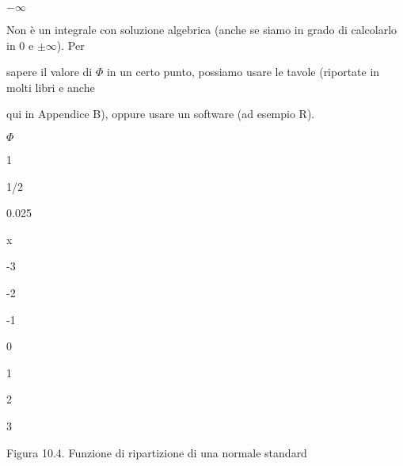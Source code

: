 \documentclass[a4paper,portrait,12pt]{article}
\begin{document}
$-$$\infty$





\begin{flushleft}
Non \`{e} un integrale con soluzione algebrica (anche se siamo in grado di calcolarlo in 0 e $\pm$$\infty$). Per
\end{flushleft}


\begin{flushleft}
sapere il valore di $\Phi$ in un certo punto, possiamo usare le tavole (riportate in molti libri e anche
\end{flushleft}


\begin{flushleft}
qui in Appendice B), oppure usare un software (ad esempio R).
\end{flushleft}





\begin{flushleft}
$\Phi$
\end{flushleft}


1





1/2





0.025


\begin{flushleft}
x
\end{flushleft}


-3





-2





-1





0





1





2





3





\begin{flushleft}
Figura 10.4. Funzione di ripartizione di una normale standard
\end{flushleft}
\end{document}

